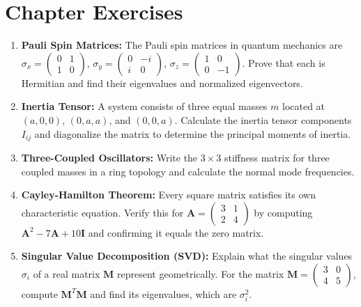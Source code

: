\section{Chapter Exercises}
\begin{enumerate}
    \item \textbf{Pauli Spin Matrices:} The Pauli spin matrices in quantum mechanics are $\sigma_x = \begin{pmatrix} 0 & 1 \\ 1 & 0 \end{pmatrix}$, $\sigma_y = \begin{pmatrix} 0 & -i \\ i & 0 \end{pmatrix}$, $\sigma_z = \begin{pmatrix} 1 & 0 \\ 0 & -1 \end{pmatrix}$. Prove that each is Hermitian and find their eigenvalues and normalized eigenvectors.
    \item \textbf{Inertia Tensor:} A system consists of three equal masses $m$ located at $(a, 0, 0)$, $(0, a, a)$, and $(0, 0, a)$. Calculate the inertia tensor components $I_{ij}$ and diagonalize the matrix to determine the principal moments of inertia.
    \item \textbf{Three-Coupled Oscillators:} Write the $3 \times 3$ stiffness matrix for three coupled masses in a ring topology and calculate the normal mode frequencies.
    \item \textbf{Cayley-Hamilton Theorem:} Every square matrix satisfies its own characteristic equation. Verify this for $\mathbf{A} = \begin{pmatrix} 3 & 1 \\ 2 & 4 \end{pmatrix}$ by computing $\mathbf{A}^2 - 7\mathbf{A} + 10\mathbf{I}$ and confirming it equals the zero matrix.
    \item \textbf{Singular Value Decomposition (SVD):} Explain what the singular values $\sigma_i$ of a real matrix $\mathbf{M}$ represent geometrically. For the matrix $\mathbf{M} = \begin{pmatrix} 3 & 0 \\ 4 & 5 \end{pmatrix}$, compute $\mathbf{M}^T\mathbf{M}$ and find its eigenvalues, which are $\sigma_i^2$.
\end{enumerate}
